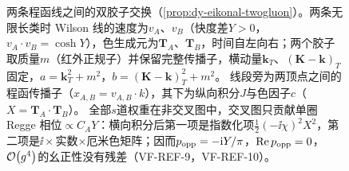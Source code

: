 \begin{figure}[htbp]
\caption{两条程函线之间的双胶子交换（\cref{prop:dy-eikonal-twogluon}）。两条无限长类时 Wilson 线的速度为$v_A$、$v_B$（快度差$Y>0$，$v_A\cdot v_B=\cosh Y$），色生成元为$\mathbf T_A$、$\mathbf T_B$，时间自左向右；两个胶子取质量$m$（红外正规子）并保留完整传播子，横动量$\mathbf k_T$、$(\mathbf K-\mathbf k)_T$固定，$a=\mathbf k_T^2+m^2$，$b=(\mathbf K-\mathbf k)_T^2+m^2$。
线段旁为两顶点之间的程函传播子（$x_{A,B}=v_{A,B}\cdot k$），其下为纵向积分$J$与色因子$c$（$X=\mathbf T_A\cdot\mathbf T_B$）。
全部$s$道权重在非交叉图中，交叉图只贡献单圈 Regge 相位$\propto C_AY$：横向积分后第一项是指数化项$\frac12(-\ii\chi)^2X^2$，第二项是$\ii\times$实数$\times$厄米色矩阵；因而$p_{\rm opp}=-\mathrm{i} Y/\pi$，${\rm Re}\,p_{\rm opp}=0$，$\mathcal{O}\!\left(g^4\right)$的幺正性没有残差（VF-REF-9，VF-REF-10）。}
\label{fig:dy-two-gluon-exchange}
\end{figure}

